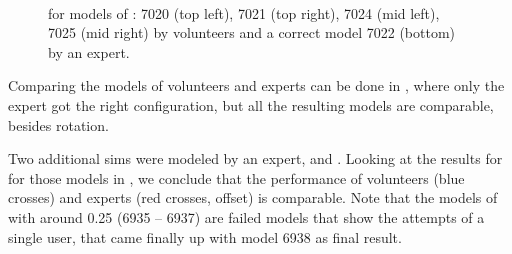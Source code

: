 \begin{figure}
  \centering
   \\
  \caption{\kenc for models of : 7020 (top left), 7021 (top right), 7024 (mid left), 7025 (mid right) by volunteers and a correct model 7022 (bottom) by an expert.}
  \label{fig:kapenc_compare_faulty}
\end{figure}

Comparing the models of volunteers and experts can be done in , where only the
expert got the right configuration, but all the resulting models are comparable, besides rotation.

Two additional sims were modeled by an expert,  and .
Looking at the results for \ERg for those models in , we conclude that the performance of volunteers (blue crosses) and experts (red crosses, offset) is comparable.
Note that the models of  with \ERg[, rel] around 0.25 (6935 -- 6937) are failed models that show the attempts of a single user, that came finally up with model 6938 as final result.

\clearpage
